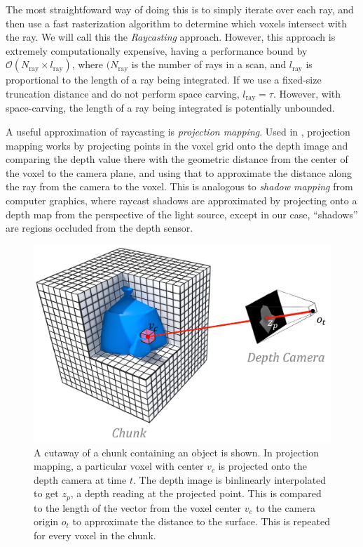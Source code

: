 \documentclass[10pt,twocolumn,letterpaper]{article}
\begin{document}
The most straightfoward way of doing this is to simply iterate over each ray,
and then use a fast rasterization algorithm \cite{RayTracing} to determine which
voxels intersect with the ray. We will call this the \textit{Raycasting}
approach. However, this approach is extremely computationally expensive, having
a performance bound by $\mathcal{O}(N_{\text{ray}} \times
l_{\text{ray}})$, where $(N_{\text{ray}}$ is the number of rays in a 
scan, and $l_{\text{ray}}$  is  proportional to the length of a ray
being integrated. If we use a fixed-size truncation distance and do not perform 
space carving, $l_{\text{ray}} = \tau$. However, with space-carving,
the length of a ray being integrated is potentially unbounded.

A useful approximation of raycasting is \textit{projection mapping}. Used in
\cite{Nguyen2012, Bylow2013, Klingensmith2014}, projection mapping works by
projecting points in the voxel grid onto the depth image and comparing the depth value
there with the geometric distance from the center of the voxel to the camera
plane, and using that to approximate the distance along the ray from the camera
to the voxel. This is analogous to \textit{shadow mapping} \cite{Shadowmapping}
from computer graphics, where raycast shadows are approximated by projecting
onto a depth map from the perspective of the light source, except in our case, 
``shadows'' are regions occluded from the depth sensor.  

\begin{figure}
  \centering
    \includegraphics[width=0.95\columnwidth]{img/projection_mapping}
      \caption{A cutaway of a chunk containing an object is shown. In projection
      mapping,  a particular voxel with center $v_c$ is projected onto the depth
      camera at time $t$. The depth image is binlinearly interpolated to get
      $z_p$, a depth reading at the projected point. This is compared to the length of the vector
      from the voxel center $v_c$ to the camera origin $o_t$ to approximate the
      distance to the surface. This is repeated for every voxel in the chunk.}
  \label{fig:projection_mapping} 
\end{figure} 
\end{document}
